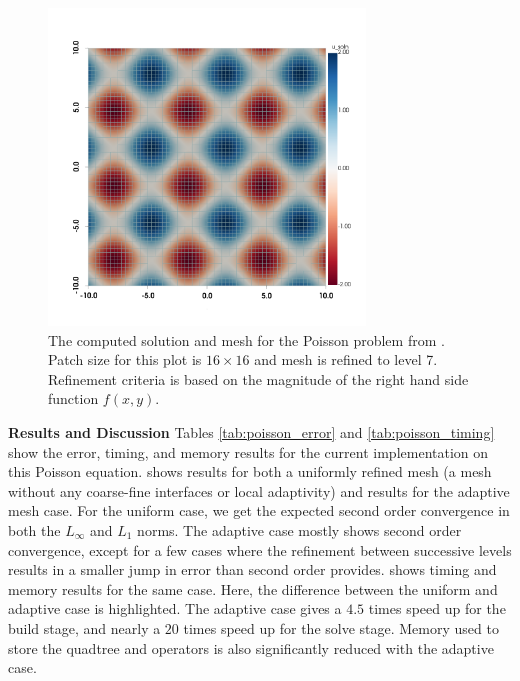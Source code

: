 \begin{figure}
    \centering
    \includegraphics[width=0.75\textwidth, trim={0 100 0 0}]{figures/plot_poisson.png}
    \caption{The computed solution and mesh for the Poisson problem from .  Patch size for this plot is $16 \times 16$ and mesh is refined to level 7.  Refinement criteria is based on the magnitude of the right hand side function $f(x,y)$.}
    \label{fig:poisson_plot}
\end{figure}

{\bf Results and Discussion}
Tables \ref{tab:poisson_error} and \ref{tab:poisson_timing} show the error, timing, and memory results for the current implementation on this Poisson equation.  shows results for both a uniformly refined mesh (a mesh without any coarse-fine interfaces or local adaptivity) and results for the adaptive mesh case. For the uniform case, we get the expected second order convergence in both the $L_{\infty}$ and $L_1$ norms. The adaptive case mostly shows second order convergence, except for a few cases where the refinement between successive levels results in a smaller jump in error than second order provides.  shows timing and memory results for the same case. Here, the difference between the uniform and adaptive case is highlighted. The adaptive case gives a $4.5$ times speed up for the build stage, and nearly a $20$ times speed up for the solve stage. Memory used to store the quadtree and operators is also significantly reduced with the adaptive case.

